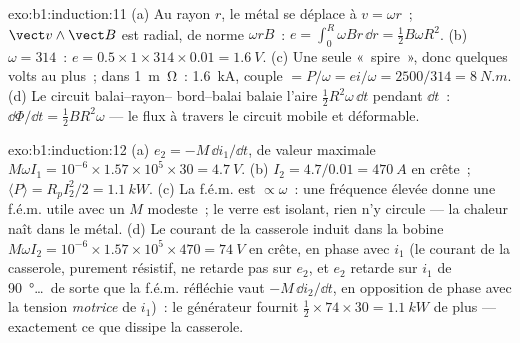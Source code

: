 \begin{solution}{exo:b1:induction:11}
(a) Au rayon $r$, le métal se déplace à $v = \omega r$~; $\vect v\wedge\vect B$ est
radial, de norme $\omega rB$~: $e = \int_0^R\omega Br\,\dd r = \tfrac12B\omega R^2$.
(b) $\omega = 314$~: $e = 0.5 \times 1 \times 314 \times 0.01 = \qty{1.6}{V}$. (c) Une
seule «~spire~», donc quelques volts au plus~; dans \qty{1}{m\ohm}~: \qty{1.6}{kA}, couple
$= P/\omega = ei/\omega = 2500/314 = \qty{8}{N.m}$. (d) Le circuit balai--rayon--
bord--balai balaie l'aire $\tfrac12R^2\omega\,\dd t$ pendant $\dd t$~: $\dd\Phi/\dd t =
\tfrac12BR^2\omega$ --- le flux à travers le circuit mobile et déformable.
\end{solution}

\begin{solution}{exo:b1:induction:12}
(a) $e_2 = -M\,\dd i_1/\dd t$, de valeur maximale $M\omega I_1 = 10^{-6} \times 1.57 \times 10^5 \times 30 =
\qty{4.7}{V}$. (b) $I_2 = 4.7/0.01 = \qty{470}{A}$ en crête~; $\langle P\rangle = R_pI_2^2/2
= \qty{1.1}{kW}$. (c) La f.é.m. est $\propto\omega$~: une fréquence élevée donne une
f.é.m. utile avec un $M$ modeste~; le verre est isolant, rien n'y circule
--- la chaleur naît dans le métal. (d) Le courant de la casserole induit dans
la bobine $M\omega I_2 = 10^{-6} \times 1.57 \times 10^5 \times 470 = \qty{74}{V}$ en crête,
en phase avec $i_1$ (le courant de la casserole, purement résistif, ne
retarde pas sur $e_2$, et $e_2$ retarde sur $i_1$ de \qty{90}{\degree}\ldots\ de sorte que la
f.é.m. réfléchie vaut $-M\,\dd i_2/\dd t$, en opposition de phase avec la
tension \emph{motrice} de $i_1$)~: le générateur fournit $\tfrac12 \times 74 \times 30 =
\qty{1.1}{kW}$ de plus --- exactement ce que dissipe la casserole.
\end{solution}

